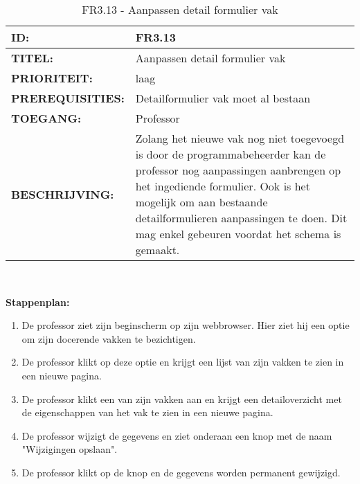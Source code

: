 \noindent\begin{table}[H]
            \begin{tabular}{l | p{10cm}}
                \textbf{ID:} & FR3.13 \\ \hline
                \textbf{TITEL:} & Aanpassen detail formulier vak \\ \hline
                \textbf{PRIORITEIT:} &  laag \\ \hline
                \textbf{PREREQUISITIES:} & Detailformulier vak moet al bestaan\\ \hline
                \textbf{TOEGANG:} & Professor\\ \hline
                \textbf{BESCHRIJVING:} & Zolang het nieuwe vak nog niet toegevoegd is door de programmabeheerder kan de professor nog aanpassingen aanbrengen op het ingediende formulier. Ook is het mogelijk om aan bestaande detailformulieren aanpassingen te doen. Dit mag enkel gebeuren voordat het schema is gemaakt.\\ 
            \end{tabular}\\
            \caption{FR3.13 - Aanpassen detail formulier vak}
            \label{tab:FR3.13 - Aanpassen detailformulier vak}
        \end{table}

\textbf{Stappenplan:}
\begin{enumerate}
\item De professor ziet zijn beginscherm op zijn webbrowser. Hier ziet hij een optie om zijn docerende vakken te bezichtigen.
\item De professor klikt op deze optie en krijgt een lijst van zijn vakken te zien in een nieuwe pagina.
\item De professor klikt een van zijn vakken aan en krijgt een detailoverzicht met de eigenschappen van het vak te zien in een nieuwe pagina.
\item De professor wijzigt de gegevens en ziet onderaan een knop met de naam "Wijzigingen opslaan".
\item De professor klikt op de knop en de gegevens worden permanent gewijzigd.
\end{enumerate}

